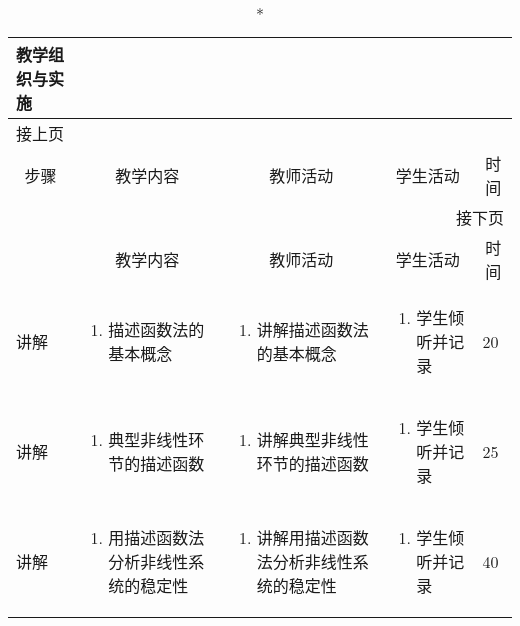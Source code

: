 {%
\begin{landscape}

\begin{longtable}{|m{10mm}|m{50mm}|m{50mm}|m{50mm}|m{15mm}|}
\caption*{\huge 教学组织与实施}\\
\hline
\endfirsthead
\multicolumn{5}{l}{\small 接上页}\\
\hline
\multicolumn{1}{|c|}{步骤}&\multicolumn{1}{c|}{教学内容}&\multicolumn{1}{c|}{教师活动}&\multicolumn{1}{c|}{学生活动}&\multicolumn{1}{c|}{时间}\\
\hline
\endhead

\multicolumn{5}{r}{\small 接下页}\\
\endfoot
\hline
\endlastfoot
\multicolumn{1}{|c|}{步骤}&\multicolumn{1}{c|}{教学内容}&\multicolumn{1}{c|}{教师活动}&\multicolumn{1}{c|}{学生活动}&\multicolumn{1}{c|}{时间}\\\hline
讲解&\begin{enumerate}
\item 描述函数法的基本概念
\end{enumerate} &\begin{enumerate}
\item 讲解描述函数法的基本概念
\end{enumerate} &\begin{enumerate}
\item 学生倾听并记录
\end{enumerate} &20\\\hline
讲解&\begin{enumerate}
\item 典型非线性环节的描述函数
\end{enumerate}
 &\begin{enumerate}
\item 讲解典型非线性环节的描述函数
\end{enumerate} &\begin{enumerate}
\item 学生倾听并记录
\end{enumerate} &25 \\\hline
讲解&\begin{enumerate}
\item 用描述函数法分析非线性系统的稳定性
\end{enumerate}
&\begin{enumerate}
\item 讲解用描述函数法分析非线性系统的稳定性
\end{enumerate} &\begin{enumerate}
\item 学生倾听并记录
\end{enumerate} &40 \\\hline


\end{longtable}
\end{landscape}}
